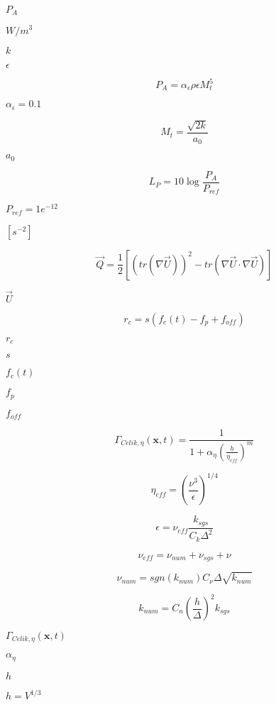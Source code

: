 \documentclass{article}
\begin{document}
$ P_A $
\pagebreak

$W/m^3$
\pagebreak

$ k $
\pagebreak

$ \epsilon $
\pagebreak

\[
        P_A = \alpha_\epsilon \rho \epsilon M_t^5
    \]
\pagebreak

$ \alpha_\epsilon = 0.1 $
\pagebreak

\[
        M_t = \frac{\sqrt{2 k}}{a_0}
    \]
\pagebreak

$ a_0 $
\pagebreak

\[
        L_P = 10 \log \frac{P_A}{P_{ref}}
    \]
\pagebreak

$ P_{ref} = 1e^{-12} $
\pagebreak

$[s^{-2}]$
\pagebreak

\[
    \vec Q = \frac{1}{2}
    [ (tr (\nabla \vec U) )^2
    - tr (\nabla \vec U \cdot \nabla \vec U) ]
\]
\pagebreak

$        \vec U       $
\pagebreak

\[
    r_c = s(f_{c}(t) - f_p + f_{off})
\]
\pagebreak

$        r_c             $
\pagebreak

$        s               $
\pagebreak

$        f_{c}(t)        $
\pagebreak

$        f_p             $
\pagebreak

$        f_{off}         $
\pagebreak

\[
    \Gamma_{Celik,\eta}(\mathbf{x}, t) =
        \frac{1}{1 + \alpha_\eta \left(\frac{h}{\eta_{eff}}\right)^m}
\]
\pagebreak

\[
    \eta_{eff} = \left(\frac{\nu^3}{\epsilon}\right)^{1/4}
\]
\pagebreak

\[
    \epsilon = \nu_{eff} \frac{k_{sgs}}{C_k \Delta^2}
\]
\pagebreak

\[
    \nu_{eff} = \nu_{num} + \nu_{sgs} + \nu
\]
\pagebreak

\[
    \nu_{num} = {sgn}(k_{num}) C_\nu \Delta \sqrt{k_{num}}
\]
\pagebreak

\[
    k_{num} = C_n \left(\frac{h}{\Delta}\right)^2 k_{sgs}
\]
\pagebreak

$        \Gamma_{Celik,\eta}(\mathbf{x}, t) $
\pagebreak

$        \alpha_\eta $
\pagebreak

$        h          $
\pagebreak

$h = V^{1/3} $
\pagebreak
\end{document}
